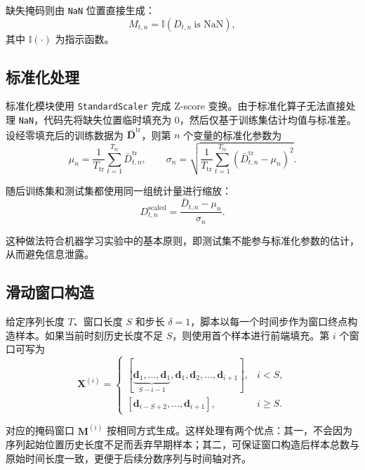 缺失掩码则由 \texttt{NaN} 位置直接生成：
\begin{equation}
    M_{t,n} = \mathbb{I}(D_{t,n}\ \text{is NaN}),
\end{equation}
其中 $\mathbb{I}(\cdot)$ 为指示函数。

\subsection{标准化处理}

标准化模块使用 \texttt{StandardScaler} 完成 Z-score 变换。由于标准化算子无法直接处理 \texttt{NaN}，代码先将缺失位置临时填充为 $0$，然后仅基于训练集估计均值与标准差。设经零填充后的训练数据为 $\bar{\mathbf{D}}^{\mathrm{tr}}$，则第 $n$ 个变量的标准化参数为
\begin{equation}
    \mu_n = \frac{1}{T_{\mathrm{tr}}}\sum_{t=1}^{T_{\mathrm{tr}}} \bar{D}^{\mathrm{tr}}_{t,n},
    \qquad
    \sigma_n = \sqrt{\frac{1}{T_{\mathrm{tr}}}\sum_{t=1}^{T_{\mathrm{tr}}}
    \left(\bar{D}^{\mathrm{tr}}_{t,n} - \mu_n\right)^2 }.
\end{equation}

随后训练集和测试集都使用同一组统计量进行缩放：
\begin{equation}
    D^{\mathrm{scaled}}_{t,n} = \frac{\bar{D}_{t,n} - \mu_n}{\sigma_n}.
\end{equation}

这种做法符合机器学习实验中的基本原则，即测试集不能参与标准化参数的估计，从而避免信息泄露。

\subsection{滑动窗口构造}

给定序列长度 $T$、窗口长度 $S$ 和步长 $\delta=1$，脚本以每一个时间步作为窗口终点构造样本。如果当前时刻历史长度不足 $S$，则使用首个样本进行前端填充。第 $i$ 个窗口可写为
\begin{equation}
    \mathbf{X}^{(i)} =
    \begin{cases}
        [\underbrace{\mathbf{d}_1, \ldots, \mathbf{d}_1}_{S-i-1}, \mathbf{d}_1, \mathbf{d}_2, \ldots, \mathbf{d}_{i+1}], & i < S, \\
        [\mathbf{d}_{i-S+2}, \ldots, \mathbf{d}_{i+1}], & i \geq S.
    \end{cases}
\end{equation}

对应的掩码窗口 $\mathbf{M}^{(i)}$ 按相同方式生成。这样处理有两个优点：其一，不会因为序列起始位置历史长度不足而丢弃早期样本；其二，可保证窗口构造后样本总数与原始时间长度一致，更便于后续分数序列与时间轴对齐。

